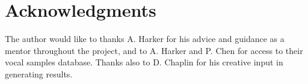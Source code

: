 \documentclass[titlepage]{scrartcl}
\begin{document}
    \section*{Acknowledgments}
    The author would like to thanks A. Harker for his advice and guidance
    as a mentor throughout the project, and to A. Harker and P. Chen for access
    to their vocal samples database.  Thanks also to D. Chaplin for his
    creative input in generating results.

    \printbibliography
\end{document}

